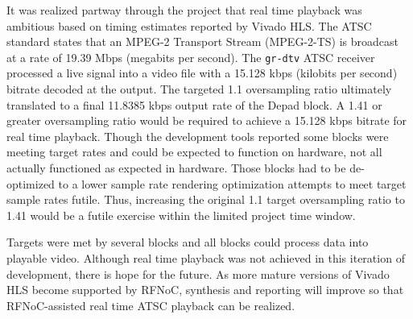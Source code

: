 \documentclass{article}
\begin{document}
It was realized partway through the project that real time playback was ambitious based on timing estimates reported by Vivado HLS. The ATSC standard \cite{atsc} states that an  MPEG-2 Transport Stream (MPEG-2-TS) is broadcast at a rate of 19.39 Mbps (megabits per second). The {\tt gr-dtv} ATSC receiver processed a live signal into a video file with a 15.128 kbps (kilobits per second) bitrate decoded at the output. The targeted 1.1 oversampling ratio ultimately translated to a final 11.8385 kbps output rate of the Depad block. A 1.41 or greater oversampling ratio would be required to achieve a 15.128 kbps bitrate for real time playback. Though the development tools reported some blocks were meeting target rates and could be expected to function on hardware, not all actually functioned as expected in hardware. Those blocks had to be de-optimized to a lower sample rate rendering optimization attempts to meet target sample rates futile. Thus, increasing the original 1.1 target oversampling ratio to 1.41 would be a futile exercise within the limited project time window.

Targets were met by several blocks and all blocks could process data into playable video. Although real time playback was not achieved in this iteration of development, there is hope for the future. As more mature versions of Vivado HLS become supported by RFNoC, synthesis and reporting will improve so that RFNoC-assisted real time ATSC playback can be realized.



\end{document}
